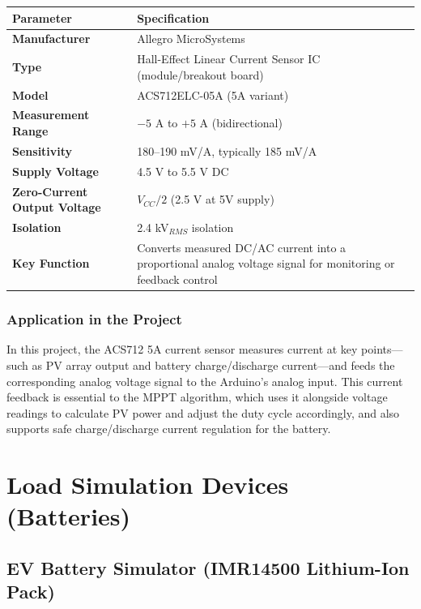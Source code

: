 \begin{tabularx}{\textwidth}{>{\bfseries}l X}
    \toprule
    Parameter & Specification \\
    \midrule
    Manufacturer & Allegro MicroSystems \\
    Type & Hall-Effect Linear Current Sensor IC (module/breakout board) \\
    Model & ACS712ELC-05A (5A variant) \\
    Measurement Range & $-5$ A to $+5$ A (bidirectional) \\
    Sensitivity & 180--190 mV/A, typically 185 mV/A \\
    Supply Voltage & 4.5 V to 5.5 V DC \\
    Zero-Current Output Voltage & $V_{CC}/2$ (2.5 V at 5V supply) \\
    Isolation & 2.4 kV$_{RMS}$ isolation \\
    Key Function & Converts measured DC/AC current into a proportional analog voltage signal for monitoring or feedback control \\
    \bottomrule
\end{tabularx}

\subsubsection{Application in the Project}
In this project, the ACS712 5A current sensor measures current at key points—such as PV array output and battery charge/discharge current—and feeds the corresponding analog voltage signal to the Arduino's analog input. This current feedback is essential to the MPPT algorithm, which uses it alongside voltage readings to calculate PV power and adjust the duty cycle accordingly, and also supports safe charge/discharge current regulation for the battery.

\section{Load Simulation Devices (Batteries)}

\subsection{EV Battery Simulator (IMR14500 Lithium-Ion Pack)}

